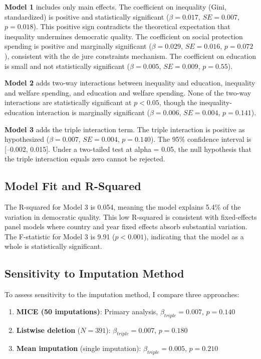 \documentclass[11pt,letterpaper]{article}
\begin{document}
\textbf{Model 1} includes only main effects. The coefficient on inequality (Gini, standardized) is positive and statistically significant ($\beta = 0.017$, $SE = 0.007$, $p = 0.018$). This positive sign contradicts the theoretical expectation that inequality undermines democratic quality. The coefficient on social protection spending is positive and marginally significant ($\beta = 0.029$, $SE = 0.016$, $p = 0.072$), consistent with the de jure constraints mechanism. The coefficient on education is small and not statistically significant ($\beta = 0.005$, $SE = 0.009$, $p = 0.55$).

\textbf{Model 2} adds two-way interactions between inequality and education, inequality and welfare spending, and education and welfare spending. None of the two-way interactions are statistically significant at $p < 0.05$, though the inequality-education interaction is marginally significant ($\beta = 0.006$, $SE = 0.004$, $p = 0.141$).

\textbf{Model 3} adds the triple interaction term. The triple interaction is positive as hypothesized ($\beta = 0.007$, $SE = 0.004$, $p = 0.140$). The 95\% confidence interval is [--0.002, 0.015]. Under a two-tailed test at alpha = 0.05, the null hypothesis that the triple interaction equals zero cannot be rejected.

\subsection{Model Fit and R-Squared}

The R-squared for Model 3 is 0.054, meaning the model explains 5.4\% of the variation in democratic quality. This low R-squared is consistent with fixed-effects panel models where country and year fixed effects absorb substantial variation. The F-statistic for Model 3 is 9.91 ($p < 0.001$), indicating that the model as a whole is statistically significant.

\subsection{Sensitivity to Imputation Method}

To assess sensitivity to the imputation method, I compare three approaches:

\begin{enumerate}
    \item \textbf{MICE (50 imputations)}: Primary analysis, $\beta_{triple} = 0.007$, $p = 0.140$
    \item \textbf{Listwise deletion} ($N = 391$): $\beta_{triple} = 0.007$, $p = 0.180$
    \item \textbf{Mean imputation} (single imputation): $\beta_{triple} = 0.005$, $p = 0.210$
\end{enumerate}
\end{document}
